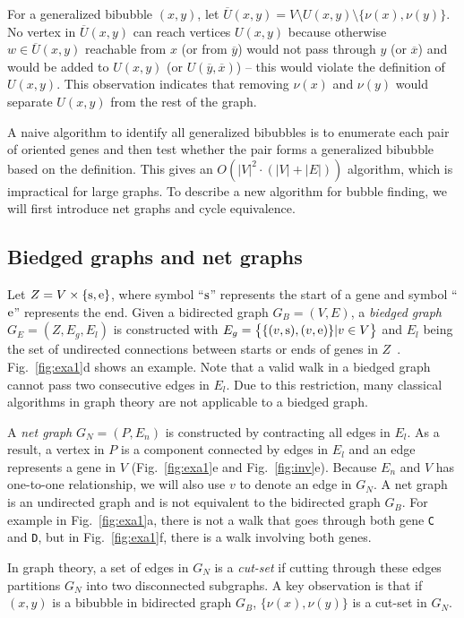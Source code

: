 \documentclass[webpdf,contemporary,large,namedate]{oup-authoring-template}%
\begin{document}
For a generalized bibubble $(x,y)$, let $\overline{U}(x,y)=V\setminus U(x,y)\setminus\{\nu(x),\nu(y)\}$.
No vertex in $\overline{U}(x,y)$ can reach vertices $U(x,y)$
because otherwise $w\in\overline{U}(x,y)$ reachable from $x$ (or from $\overline{y}$)
would not pass through $y$ (or $\overline{x}$) and would be added to $U(x,y)$ (or $U(\overline{y},\overline{x})$)
-- this would violate the definition of $U(x,y)$.
This observation indicates that removing $\nu(x)$ and $\nu(y)$ would separate $U(x,y)$ from the rest of the graph.

A naive algorithm to identify all generalized bibubbles is to enumerate each pair of oriented genes
and then test whether the pair forms a generalized bibubble based on the definition.
This gives an $O(|V|^2\cdot(|V|+|E|))$ algorithm, which is impractical for large graphs.
To describe a new algorithm for bubble finding, we will first introduce net graphs and cycle equivalence.

\subsection{Biedged graphs and net graphs}

Let $Z=V\times\{{\rm s},{\rm e}\}$, where symbol ``${\rm s}$'' represents the start of a gene
and symbol ``${\rm e}$'' represents the end.
Given a bidirected graph $G_B=(V,E)$, a \emph{biedged graph} $G_E=(Z,E_g,E_l)$ is constructed
with $E_g=\big\{\{(v,{\rm s}),(v,{\rm e})\}|v\in V\big\}$ and $E_l$ being the set of undirected connections between starts or ends of genes in $Z$~\citep{Paten:2018aa}.
Fig.~\ref{fig:exa1}d shows an example.
Note that a valid walk in a biedged graph cannot pass two consecutive edges in $E_l$.
Due to this restriction, many classical algorithms in graph theory are not applicable to a biedged graph.

A \emph{net graph} $G_N=(P,E_n)$ is constructed by contracting all edges in $E_l$.
As a result, a vertex in $P$ is a component connected by edges in $E_l$
and an edge represents a gene in $V$ (Fig.~\ref{fig:exa1}e and Fig.~\ref{fig:inv}e).
Because $E_n$ and $V$ has one-to-one relationship, we will also use $v$ to denote an edge in $G_N$.
A net graph is an undirected graph and is not equivalent to the bidirected graph $G_B$.
For example in Fig.~\ref{fig:exa1}a, there is not a walk that goes through both gene {\tt C} and {\tt D},
but in Fig.~\ref{fig:exa1}f, there is a walk involving both genes.

In graph theory, a set of edges in $G_N$ is a \emph{cut-set} if cutting through these edges
partitions $G_N$ into two disconnected subgraphs.
A key observation is that if $(x,y)$ is a bibubble in bidirected graph $G_B$,
$\{\nu(x),\nu(y)\}$ is a cut-set in $G_N$.
\end{document}
